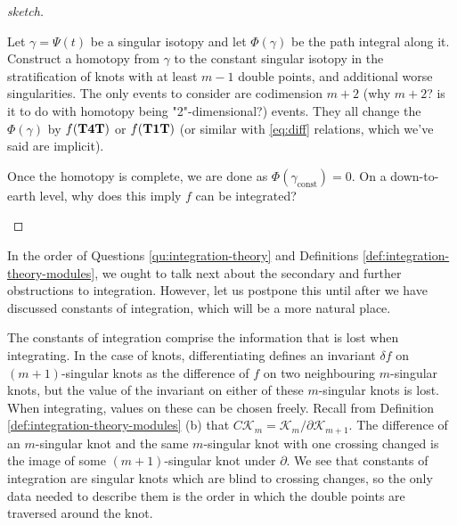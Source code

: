 \begin{proof}[sketch]
	\begin{mdframed}
		Let \(\gamma = \Psi(t)\) be a singular isotopy and let \(\Phi(\gamma)\) be the path integral along it. Construct a homotopy from \(\gamma\) to the constant singular isotopy in the stratification of knots with at least \(m - 1\) double points, and additional worse singularities. The only events to consider are codimension \(m + 2\) (why \(m + 2\)? is it to do with homotopy being "2"-dimensional?) events. They all change the \(\Phi(\gamma)\) by \(f(\mathbf{T4T})\) or \(f(\mathbf{T1T})\) (or similar with \ref{eq:diff} relations, which we've said are implicit).

		Once the homotopy is complete, we are done as \(\Phi(\gamma_{\text{const}}) = 0\). On a down-to-earth level, why does this imply \(f\) can be integrated?
	\end{mdframed}
\end{proof}

In the order of Questions \ref{qu:integration-theory} and Definitions \ref{def:integration-theory-modules}, we ought to talk next about the secondary and further obstructions to integration. However, let us postpone this until after we have discussed constants of integration, which will be a more natural place.

The constants of integration comprise the information that is lost when integrating. In the case of knots, differentiating defines an invariant \(\delta f\) on \((m + 1)\)-singular knots as the difference of \(f\) on two neighbouring \(m\)-singular knots, but the value of the invariant on either of these \(m\)-singular knots is lost. When integrating, values on these can be chosen freely. Recall from Definition \ref{def:integration-theory-modules} (b) that \(C\mathcal{K}_{m} = \mathcal{K}_{m} / \partial \mathcal{K}_{m + 1}\). The difference of an \(m\)-singular knot and the same \(m\)-singular knot with one crossing changed is the image of some \((m + 1)\)-singular knot under \(\partial\). We see that constants of integration are singular knots which are blind to crossing changes, so the only data needed to describe them is the order in which the double points are traversed around the knot.

